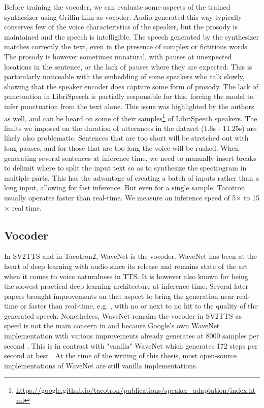 \documentclass[a4paper, oneside, 12pt, english]{article}
\begin{document}
Before training the vocoder, we can evaluate some aspects of the trained synthesizer using Griffin-Lim \citep{GriffinLim} as vocoder. Audio generated this way typically conserves few of the voice characteristics of the speaker, but the prosody is maintained and the speech is intelligible. The speech generated by the synthesizer matches correctly the text, even in the presence of complex or fictitious words. The prosody is however sometimes unnatural, with pauses at unexpected locations in the sentence, or the lack of pauses where they are expected. This is particularly noticeable with the embedding of some speakers who talk slowly, showing that the speaker encoder does capture some form of prosody. The lack of punctuation in LibriSpeech is partially responsible for this, forcing the model to infer punctuation from the text alone. This issue was highlighted by the authors as well, and can be heard on some of their samples\footnote{\url{https://google.github.io/tacotron/publications/speaker_adaptation/index.html}} of LibriSpeech speakers. The limits we imposed on the duration of utterances in the dataset (1.6s - 11.25s) are likely also problematic. Sentences that are too short will be stretched out with long pauses, and for those that are too long the voice will be rushed. When generating several sentences at inference time, we need to manually insert breaks to delimit where to split the input text so as to synthesize the spectrogram in multiple parts. This has the advantage of creating a batch of inputs rather than a long input, allowing for fast inference. But even for a single sample, Tacotron usually operates faster than real-time. We measure an inference speed of 5$\times$ to 15$\times$ real time.


\subsection{Vocoder} \label{vocoder}
In SV2TTS and in Tacotron2, WaveNet is the vocoder. WaveNet has been at the heart of deep learning with audio since its release and remains state of the art when it comes to voice naturalness in TTS. It is however also known for being the slowest practical deep learning architecture at inference time. Several later papers brought improvements on that aspect to bring the generation near real-time or faster than real-time, e.g. \citep{ParallelWaveNet, FastWaveNet, WaveRNN}, with no or next to no hit to the quality of the generated speech. Nonetheless, WaveNet remains the vocoder in SV2TTS as speed is not the main concern in \citep{SV2TTS} and because Google's own WaveNet implementation with various improvements already generates at 8000 samples per second \citep[page~2]{WaveRNN}. This is in contrast with "vanilla" WaveNet which generates 172 steps per second at best \citep[page 7]{ParallelWaveNet}. At the time of the writing of this thesis, most open-source implementations of WaveNet are still vanilla implementations.
\end{document}
